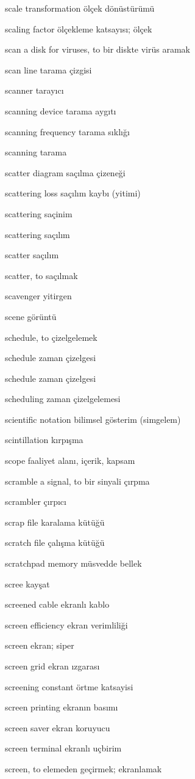 \documentclass[12pt,fleqn]{article}\usepackage{../../common}
\begin{document}
scale transformation ölçek dönüstürümü

scaling factor ölçekleme katsayısı; ölçek

scan a disk for viruses, to bir diskte virüs aramak

scan line tarama çizgisi

scanner tarayıcı

scanning device tarama aygıtı

scanning frequency tarama sıklığı

scanning tarama

scatter diagram saçılma çizeneği

scattering loss saçılım kaybı (yitimi)

scattering saçinim

scattering saçılım

scatter saçılım

scatter, to saçılmak

scavenger yitirgen

scene görüntü

schedule, to çizelgelemek

schedule zaman çizelgesi

schedule zaman çizelgesi

scheduling zaman çizelgelemesi

scientific notation bilimsel gösterim (simgelem)

scintillation kırpışma

scope faaliyet alanı, içerik, kapsam

scramble a signal, to bir sinyali çırpma

scrambler çırpıcı

scrap file karalama kütüğü

scratch file çalışma kütüğü

scratchpad memory müsvedde bellek

scree kayşat

screened cable ekranlı kablo

screen efficiency ekran verimliliği

screen ekran; siper

screen grid ekran ızgarası

screening constant örtme katsayisi

screen printing ekranın basımı

screen saver ekran koruyucu

screen terminal ekranlı uçbirim

screen, to elemeden geçirmek; ekranlamak
\end{document}
